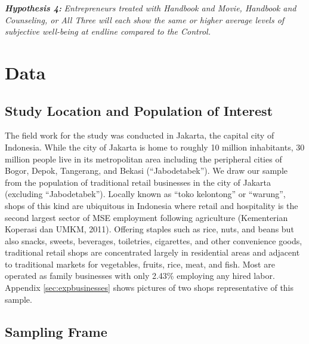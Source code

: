 \documentclass[11.5pt]{article}
\begin{document}
\noindent \emph{\textbf{Hypothesis 4:}} \emph{Entrepreneurs treated with \emph{Handbook and Movie}, \emph{Handbook and Counseling}, or \emph{All Three} will each show the same or higher average levels of subjective well-being at endline compared to the \emph{Control}.}

\section{\textbf{Data}}


\subsection{Study Location and Population of Interest}

The field work for the study was conducted in Jakarta, the capital city of Indonesia. While the city of Jakarta is home to roughly 10 million inhabitants, 30 million people live in its metropolitan area including the peripheral cities of Bogor, Depok, Tangerang, and Bekasi (``Jabodetabek''). We draw our sample from the population of traditional retail businesses in the city of Jakarta (excluding ``Jabodetabek''). Locally known as ``toko kelontong'' or ``warung'', shops of this kind are ubiquitous in Indonesia where retail and hospitality is the second largest sector of MSE employment following agriculture (Kementerian Koperasi dan UMKM, 2011). Offering staples such as rice, nuts, and beans but also snacks, sweets, beverages, toiletries, cigarettes, and other convenience goods, traditional retail shops are concentrated largely in residential areas and adjacent to traditional markets for vegetables, fruits, rice, meat, and fish. Most are operated as family businesses with only 2.43\% employing any hired labor. Appendix \ref{sec:expbusinesses} shows pictures of two shops representative of this sample.


\subsection{Sampling Frame}
\end{document}
